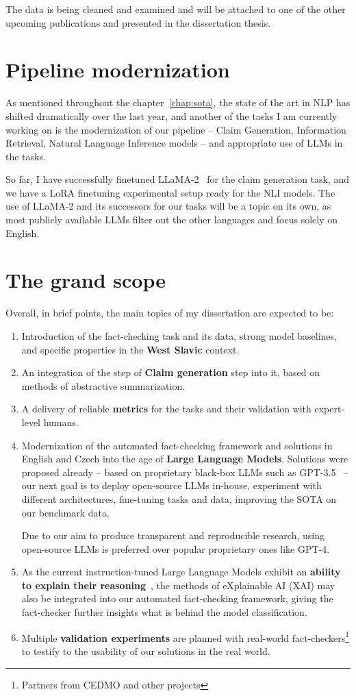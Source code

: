 The data is being cleaned and examined and will be attached to one of the other upcoming publications and presented in the dissertation thesis.

\section{Pipeline modernization}
As mentioned throughout the chapter~\ref{chap:sota}, the state of the art in NLP has shifted dramatically over the last year, and another of the tasks I am currently working on is the modernization of our pipeline -- Claim Generation, Information Retrieval, Natural Language Inference models -- and appropriate use of LLMs in the tasks.

So far, I have successfully finetuned LLaMA-2~\cite{llama2} for the claim generation task, and we have a LoRA finetuning experimental setup ready for the NLI models.
The use of LLaMA-2 and its successors for our tasks will be a topic on its own, as most publicly available LLMs filter out the other languages and focus solely on English.

\section{The grand scope}
Overall, in brief points, the main topics of my dissertation are expected to be:
\begin{enumerate}
    \item Introduction of the fact-checking task and its data, strong model baselines, and specific properties in the \textbf{West Slavic} context.
    \item An integration of the step of \textbf{Claim generation} step into it, based on methods of abstractive summarization.
    \item A delivery of reliable \textbf{metrics} for the tasks and their validation with expert-level humans.
    \item Modernization of the automated fact-checking framework and solutions in English and Czech into the age of \textbf{Large Language Models}.
    Solutions were proposed already -- based on proprietary black-box LLMs such as GPT-3.5~\cite{bing} -- our next goal is to deploy open-source LLMs in-house, experiment with different architectures, fine-tuning tasks and data, improving the SOTA on our benchmark data.

    Due to our aim to produce transparent and reproducible research, using open-source LLMs is preferred over popular proprietary ones like GPT-4.
    \item As the current instruction-tuned Large Language Models exhibit an \textbf{ability to explain their reasoning}~\cite{SAEED2023110273}, the methods of eXplainable AI (XAI) may also be integrated into our automated fact-checking framework, giving the fact-checker further insights what is behind the model classification.
    \item Multiple \textbf{validation experiments} are planned with real-world fact-checkers\footnote{Partners from CEDMO and other projects} to testify to the usability of our solutions in the real world.
\end{enumerate}
